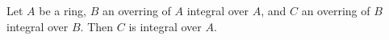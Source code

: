 Let $A$ be a ring, $B$ an overring of $A$ integral over $A$, and $C$ an overring of $B$ integral over $B$. Then $C$ is integral over $A$.

